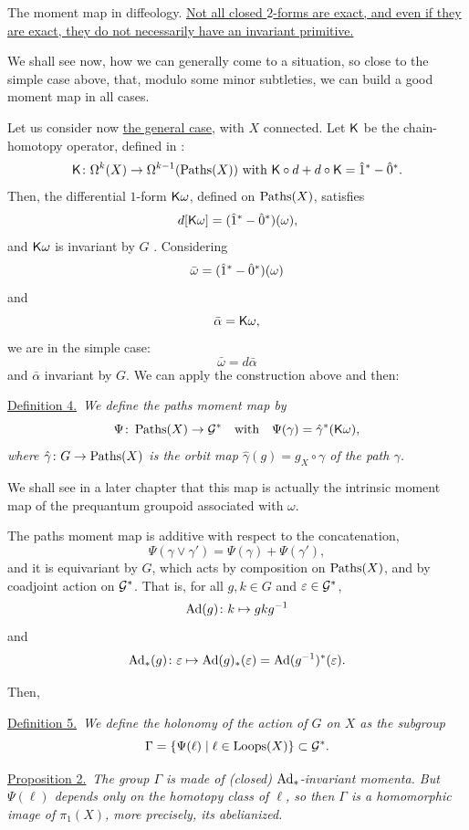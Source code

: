 \begin{Article}{The moment map in diffeology.}{}
  \uline{Not all closed $2$-forms are exact,
  and even if they are exact,
  they do not necessarily have an invariant primitive.}
  
  We shall see now,
  how we can generally come to a situation,
  so close to the simple case above,
  that,
  modulo some minor subtleties,
  we can build a good moment map in all cases.
  
  Let us consider now \uline{the general case},
  with $X$ connected.
  Let $\mathsf{K}$ be the chain-homotopy operator, defined in \cite[\textsection\,6.83]{PIZ13}:
  $$%
    \CHO \colon \DForms^k(X) \to \DForms^{k-1}(\Paths(X))
    \SpacedText{with}
    \CHO \circ d + d \circ \CHO = \hat 1^* - \hat 0^*.
    $$%
  Then,
  the differential $1$-form $\mathsf{K}\omega$,
  defined on $\operatorname{Paths}(X)$,
  satisfies
  $$%
    d[\CHO\omega] = (\1^* - \0^*)(\omega),
    $$%
  and $\mathsf{K}\omega$ is invariant by $G$ \cite[\textsection\,6.84]{PIZ13}.
  Considering
  $$%
    \bar\omega = (\1^* - \0^*)(\omega)
    $$%
  and
  $$%
    \bar\alpha = \CHO\omega,
    $$%
  we are in the simple case:
  $$%
    \bar\omega = d\bar\alpha
    $$%
  and $\bar\alpha$ invariant by $G$.
  We can apply the construction above and then:
  
  \uline{Definition 4.}~{\itshape We define the \emph{paths moment map} by
  $$%
    \Psi \colon \Paths(X) \to \cG^*
    \quad \mbox{with} \quad
    \Psi(\gamma) = \hat \gamma^*(\CHO\omega),
    $$%
  where $\hat \gamma \colon G \to \operatorname{Paths}(X)$ is the orbit map $\hat \gamma(g)= g_X \circ \gamma$ of the path $\gamma$.
  }
  
  We shall see in a later chapter that this map is actually the intrinsic moment map of the prequantum groupoid associated with $\omega$.
  
  The paths moment map is additive with respect to the concatenation,
  $$%
    \Psi(\gamma \vee \gamma') = \Psi(\gamma) + \Psi(\gamma'),
    $$%
  and it is equivariant by $G$,
  which acts by composition on $\operatorname{Paths}(X)$,
  and by coadjoint action on $\mathcal{G}^*$.
  That is,
  for all $g,k \in G$ and $\varepsilon \in \mathcal{G}^*$,
  $$%
    \Ad(g)\colon k \mapsto gkg^{-1}
    $$%
  and
  $$%
    \Ad_*(g)\colon \epsilon \mapsto \Ad(g)_*(\epsilon) =  \Ad(g^{-1})^*(\epsilon).
    $$%
  
  Then,
  
  \uline{Definition 5.}~{\itshape We define the \emph{holonomy} of the action of $G$ on $X$ as the subgroup
  $$%
    \Gamma = \{\Psi(\ell) \mid \ell \in \Loops(X) \} \subset \cG^*.
    $$%
  }
  
  \uline{Proposition 2.}~{\itshape The group $\Gamma$ is made of (closed) $\mathrm{Ad}_*$-invariant momenta.
  But $\Psi(\ell)$ depends only on the homotopy class of $\ell$,
  so then $\Gamma$ is a homomorphic image of $\pi_1(X)$,
  more precisely,
  its abelianized.
  }
  

\end{Article}
